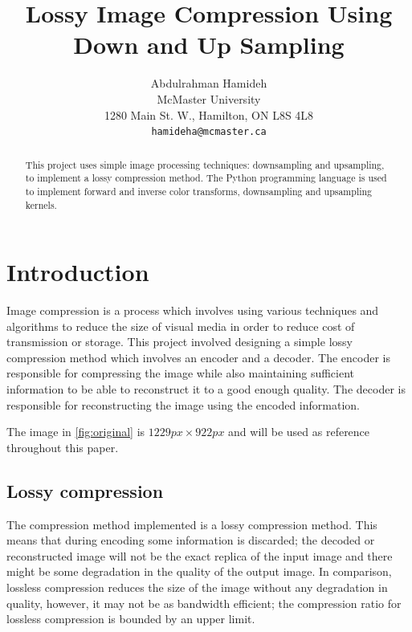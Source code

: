 \documentclass[10pt,twocolumn,letterpaper]{article}
\begin{document}
\title{Lossy Image Compression Using Down and Up Sampling}

\author{Abdulrahman Hamideh\\
McMaster University\\
1280 Main St. W., Hamilton, ON L8S 4L8\\
{\tt\small hamideha@mcmaster.ca}
}
\maketitle

\begin{abstract}
   This project uses simple image processing techniques: downsampling and upsampling, to implement a lossy compression method. The Python programming language is used to implement forward and inverse color transforms, downsampling and upsampling kernels.
\end{abstract}

\section{Introduction}
\label{sec:intro}

Image compression is a process which involves using various techniques and algorithms to reduce the size of visual media in order to reduce cost of transmission or storage. This project involved designing a simple lossy compression method which involves an encoder and a decoder. The encoder is responsible for compressing the image while also maintaining sufficient information to be able to reconstruct it to a good enough quality. The decoder is responsible for reconstructing the image using the encoded information.

The image in \cref{fig:original} is $1229px\times 922px$ and will be used as reference throughout this paper.

\subsection{Lossy compression}

The compression method implemented is a lossy compression method. This means that during encoding some information is discarded; the decoded or reconstructed image will not be the exact replica of the input image and there might be some degradation in the quality of the output image. In comparison, lossless compression reduces the size of the image without any degradation in quality, however, it may not be as bandwidth efficient; the compression ratio for lossless compression is bounded by an upper limit. 
\end{document}
